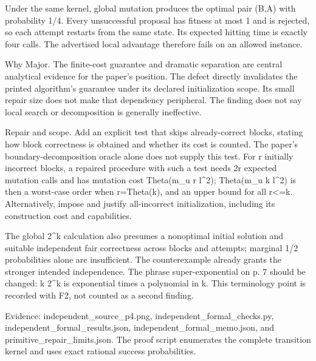 \documentclass[10pt]{article}
\begin{document}
Under the same kernel, global mutation produces the optimal pair (B,A) with probability 1/4. Every unsuccessful proposal has fitness at most 1 and is rejected, so each attempt restarts from the same state. Its expected hitting time is exactly four calls. The advertised local advantage therefore fails on an allowed instance.\par
Why Major. The finite-cost guarantee and dramatic separation are central analytical evidence for the paper’s position. The defect directly invalidates the printed algorithm’s guarantee under its declared initialization scope. Its small repair size does not make that dependency peripheral. The finding does not say local search or decomposition is generally ineffective.\par
Repair and scope. Add an explicit test that skips already-correct blocks, stating how block correctness is obtained and whether its cost is counted. The paper’s boundary-decomposition oracle alone does not supply this test. For r initially incorrect blocks, a repaired procedure with such a test needs 2r expected mutation calls and has mutation cost Theta(m\_u r l\textasciicircum{}2); Theta(m\_u k l\textasciicircum{}2) is then a worst-case order when r=Theta(k), and an upper bound for all r<=k. Alternatively, impose and justify all-incorrect initialization, including its construction cost and capabilities.\par
The global 2\textasciicircum{}k calculation also presumes a nonoptimal initial solution and suitable independent fair correctness across blocks and attempts; marginal 1/2 probabilities alone are insufficient. The counterexample already grants the stronger intended independence. The phrase super-exponential on p. 7 should be changed: k 2\textasciicircum{}k is exponential times a polynomial in k. This terminology point is recorded with F2, not counted as a second finding.\par
Evidence: independent\_source\_p4.png, independent\_formal\_checks.py, independent\_formal\_results.json, independent\_formal\_memo.json, and primitive\_repair\_limits.json. The proof script enumerates the complete transition kernel and uses exact rational success probabilities.\par
\end{document}
